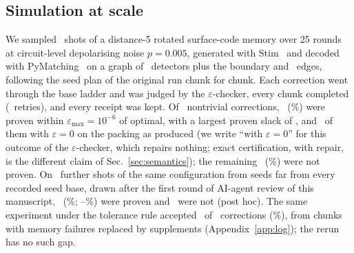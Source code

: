 \documentclass[aps,pra,twocolumn,superscriptaddress,nofootinbib,longbibliography,floatfix]{revtex4-2}
\newcommand{\eps}{\varepsilon}
\begin{document}
\subsection{Simulation at scale}

We sampled \EpsSimShots\ shots of a distance-5 rotated surface-code memory over 25 rounds at circuit-level depolarising noise $p=0.005$, generated with Stim~\cite{gidney2021stim} and decoded with PyMatching~\cite{higgott2025sparse} on a graph of \SimDetectors\ detectors plus the boundary and \SimEdges\ edges, following the seed plan of the original run chunk for chunk. Each correction went through the base ladder and was judged by the $\eps$-checker, every chunk completed (\EpsSimChunkRetries\ retries), and every receipt was kept. Of \EpsSimNontrivial\ nontrivial corrections, \EpsSimAccepted\ (\EpsSimAcceptedPct\%) were proven within $\eps_{\max}=10^{-6}$ of optimal, with a largest proven slack of \EpsSimLargestEps, and \EpsSimExact\ of them with $\eps=0$ on the packing as produced (we write ``with $\eps=0$'' for this outcome of the $\eps$-checker, which repairs nothing; exact certification, with repair, is the different claim of Sec.~\ref{sec:semantics}); the remaining \EpsSimNotProven\ (\EpsSimNotProvenPct\%) were not proven. On \FreshSimN\ further shots of the same configuration from seeds far from every recorded seed base, drawn after the first round of AI-agent review of this manuscript, \FreshSimAccepted\ (\FreshSimPct\%; \FreshSimCILo--\FreshSimCIHi\%) were proven and \FreshSimNotProven\ were not (post hoc). The same experiment under the tolerance rule accepted \SimCertified\ of \SimShots\ corrections (\SimCertifiedPct\%), from chunks with memory failures replaced by supplements (Appendix~\ref{app:log}); the rerun has no such gap.
\end{document}
